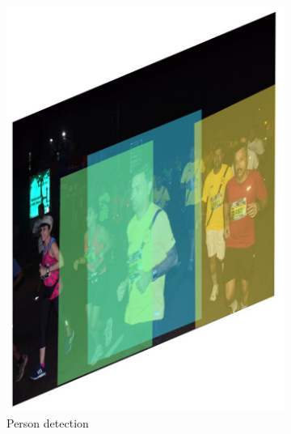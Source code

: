 \begin{landscape}
  \begin{figure}[p]
    \centering
    \begin{subfigure}[b]{0.23\paperwidth}
      \includegraphics[width=\textwidth]{images/processing/yolo_crop_person_detection}
      \caption{Person detection}
    \label{fig:processing_pipeline:person_filtering:yolo_crop_person_detection}
    \end{subfigure}
    \begin{subfigure}[b]{0.23\paperwidth}

\end{subfigure}
\end{figure}
\end{landscape}
